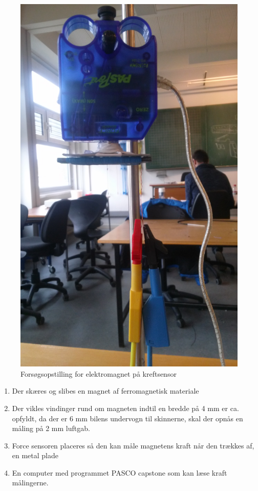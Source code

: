 \begin{figure}
\includegraphics[scale=0.02, angle=270]{./Graphics/Forsogs_opstilling}
\caption{Forsøgsopstilling for elektromagnet på kreftsensor}
\label{Opstilling}
\end{figure}

\begin{enumerate}
	\item Der skæres og slibes en magnet af ferromagnetisk materiale 
	\item Der vikles vindinger rund om magneten indtil en bredde på 4 mm er ca. opfyldt, da der er 6 mm bilens undervogn til skinnerne, skal der opnås en måling på 2 mm luftgab.
	\item Force sensoren placeres så den kan måle magnetens kraft når den trækkes af, en metal plade 
	\item En computer med programmet PASCO capstone som kan læse kraft målingerne.\\
 \end{enumerate}
  
